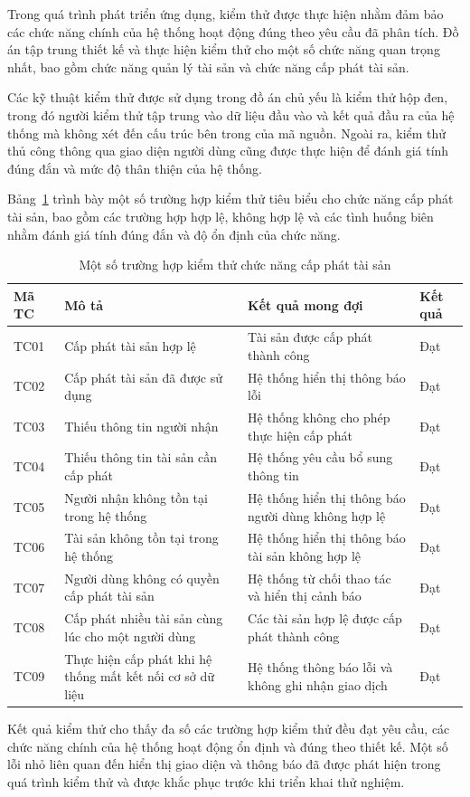 \documentclass[../DoAn.tex]{subfiles}
\begin{document}
Trong quá trình phát triển ứng dụng, kiểm thử được thực hiện nhằm đảm bảo các chức năng chính của hệ thống hoạt động đúng theo yêu cầu đã phân tích. Đồ án tập trung thiết kế và thực hiện kiểm thử cho một số chức năng quan trọng nhất, bao gồm chức năng quản lý tài sản và chức năng cấp phát tài sản.

Các kỹ thuật kiểm thử được sử dụng trong đồ án chủ yếu là kiểm thử hộp đen, trong đó người kiểm thử tập trung vào dữ liệu đầu vào và kết quả đầu ra của hệ thống mà không xét đến cấu trúc bên trong của mã nguồn. Ngoài ra, kiểm thử thủ công thông qua giao diện người dùng cũng được thực hiện để đánh giá tính đúng đắn và mức độ thân thiện của hệ thống.

Bảng~\ref{table:testcase} trình bày một số trường hợp kiểm thử tiêu biểu cho chức năng cấp phát tài sản, bao gồm các trường hợp hợp lệ, không hợp lệ và các tình huống biên nhằm đánh giá tính đúng đắn và độ ổn định của chức năng.

\begin{table}[H]
\centering
\renewcommand{\arraystretch}{1.3}
\begin{tabular}{p{3cm} p{5cm} p{4cm} p{3cm}}
\hline
\textbf{Mã TC} & \textbf{Mô tả} & \textbf{Kết quả mong đợi} & \textbf{Kết quả} \\ \hline
TC01 & Cấp phát tài sản hợp lệ & Tài sản được cấp phát thành công & Đạt \\ \hline
TC02 & Cấp phát tài sản đã được sử dụng & Hệ thống hiển thị thông báo lỗi & Đạt \\ \hline
TC03 & Thiếu thông tin người nhận & Hệ thống không cho phép thực hiện cấp phát & Đạt \\ \hline
TC04 & Thiếu thông tin tài sản cần cấp phát & Hệ thống yêu cầu bổ sung thông tin & Đạt \\ \hline
TC05 & Người nhận không tồn tại trong hệ thống & Hệ thống hiển thị thông báo người dùng không hợp lệ & Đạt \\ \hline
TC06 & Tài sản không tồn tại trong hệ thống & Hệ thống hiển thị thông báo tài sản không hợp lệ & Đạt \\ \hline
TC07 & Người dùng không có quyền cấp phát tài sản & Hệ thống từ chối thao tác và hiển thị cảnh báo & Đạt \\ \hline
TC08 & Cấp phát nhiều tài sản cùng lúc cho một người dùng & Các tài sản hợp lệ được cấp phát thành công & Đạt \\ \hline
TC09 & Thực hiện cấp phát khi hệ thống mất kết nối cơ sở dữ liệu & Hệ thống thông báo lỗi và không ghi nhận giao dịch & Đạt \\ \hline
\end{tabular}
\caption{Một số trường hợp kiểm thử chức năng cấp phát tài sản}
\label{table:testcase}
\end{table}
Kết quả kiểm thử cho thấy đa số các trường hợp kiểm thử đều đạt yêu cầu, các chức năng chính của hệ thống hoạt động ổn định và đúng theo thiết kế. Một số lỗi nhỏ liên quan đến hiển thị giao diện và thông báo đã được phát hiện trong quá trình kiểm thử và được khắc phục trước khi triển khai thử nghiệm.
\end{document}
